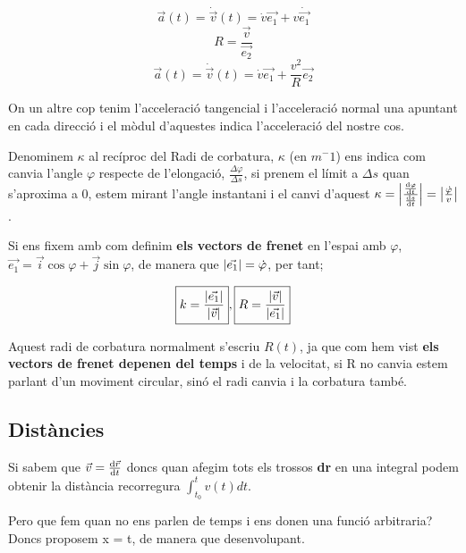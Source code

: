\documentclass[12pt]{article}
\begin{document}
\[\vec{a}(t) = \dot{\vec{v}}(t) = \dot{v}\vec{e_1} + v\dot{\vec{e_1}}\]
\[R = \frac{\vec{v}}{\vec{e_2}}\]
\[\vec{a}(t) = \dot{\vec{v}}(t) = \dot{v}\vec{e_1} + \frac{v^2}{R}{\vec{e_2}}\]

On un altre cop tenim l'acceleració tangencial i l'acceleració normal una apuntant en cada direcció i el mòdul d'aquestes indica l'acceleració del nostre cos.

Denominem $\kappa$ al recíproc del Radi de corbatura, $\kappa$ (en $m^-1$) ens indica com canvia l'angle $\varphi$ respecte de l'elongació, $\frac{\Delta \varphi}{\Delta s}$, si prenem el límit a $\Delta s$ quan s'aproxima a 0, estem mirant l'angle instantani i el canvi d'aquest $\kappa = \abs{\frac{\dv{\varphi}{t}}{\dv{s}{t}}} = \abs{\frac{\dot{\varphi}}{v}}$.

Si ens fixem amb com definim \textbf{els vectors de frenet} en l'espai amb $\varphi$, $\vec{e_1} = \vec{i}\cos \varphi + \vec{j} \sin \varphi$, de manera que $\abs{\vec{e_1}} = \dot{\varphi}$, per tant;

\[\boxed{k = \frac{\abs{\vec{e_1}}}{\abs{\vec{v}}}}, \boxed{R = \frac{\abs{\vec{v}}}{\abs{\vec{e_1}}}}\]

Aquest radi de corbatura normalment s'escriu $R(t)$, ja que com hem vist \textbf{els vectors de frenet depenen del temps} i de la velocitat, si R no canvia estem parlant d'un moviment circular, sinó  el radi canvia i la corbatura també.

\subsection{Distàncies}

Si sabem que $\vec{v} = \dv{\vec{r}}{t}$ doncs quan afegim tots els trossos \textbf{dr} en una integral podem obtenir la distància recorregura $\int_{t_0}^{t} v(t) dt$. 

\begin{center}
\end{center}

Pero que fem quan no ens parlen de temps i ens donen una funció arbitraria? Doncs proposem x = t, de manera que desenvolupant.
\end{document}
